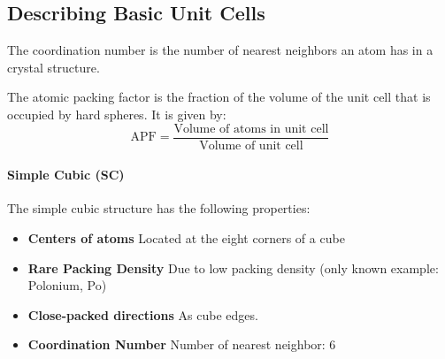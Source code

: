 \documentclass[11pt]{article}
\begin{document}
\subsection{Describing Basic Unit Cells}
\begin{definition}
    The coordination number is the number of nearest neighbors an atom has in a crystal structure.
\end{definition}
\begin{definition}
    The atomic packing factor is the fraction of the volume of the unit cell that is occupied by hard spheres. It is given by:
    \begin{equation}
        \text{APF} = \frac{\text{Volume of atoms in unit cell}}{\text{Volume of unit cell}}
    \end{equation}
\end{definition}
\paragraph{Simple Cubic (SC)} The simple cubic structure has the following properties:
\begin{itemize}
    \item \textbf{Centers of atoms} Located at the eight corners of a cube
    \item \textbf{Rare Packing Density}  Due to low packing density (only known example: Polonium, Po)
    \item \textbf{Close-packed directions} As cube edges.
    \item \textbf{Coordination Number} Number of nearest neighbor: 6
\end{itemize}
\end{document}
